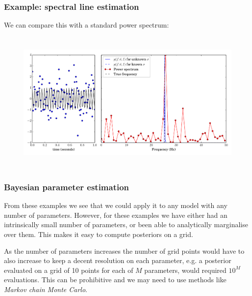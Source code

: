 \begin{frame}

\frametitle{Example: spectral line estimation}
\label{example:spectrallineestimation}

We can compare this with a standard power spectrum:

\begin{figure}[htbp]
\centering
\includegraphics[keepaspectratio,width=\textwidth,height=200pt]{figures/spectral_estimation.pdf}
\label{spectral_estimation}
\end{figure}

\end{frame}

\begin{frame}

\frametitle{Bayesian parameter estimation}
\label{bayesianparameterestimation}

From these examples we see that we could apply it to any model with any number of parameters.
However, for these examples we have either had an intrinsically small number of parameters, or
been able to analytically marginalise over them. This makes it easy to compute posteriors on a
grid.

As the number of parameters increases the number of grid points would have to also increase to keep
a decent resolution on each parameter, e.g. a posterior evaluated on a grid of 10 points for each of
$M$ parameters, would required $10^M$ evaluations. This can be prohibitive and we may need to use
methods like \emph{Markov chain Monte Carlo}.

\end{frame}

